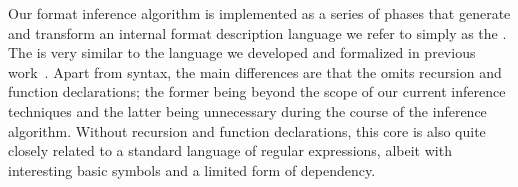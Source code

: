 Our format inference algorithm is implemented as a series of phases that
generate and transform an internal format description language we
refer to simply as the \ir.  The \ir{} is very similar to
the \ipads{} language we developed and formalized in previous 
work~\cite{fisher+:popl06}.  Apart from syntax, the main differences 
are that the \ir{} omits recursion and function declarations; the former
being beyond the scope of our current inference techniques and the 
latter being unnecessary during the course of the inference algorithm.
Without recursion and function declarations, %
this core \ir{} is also quite closely related to a standard language
of regular expressions, albeit with interesting basic symbols and
a limited form of dependency.


